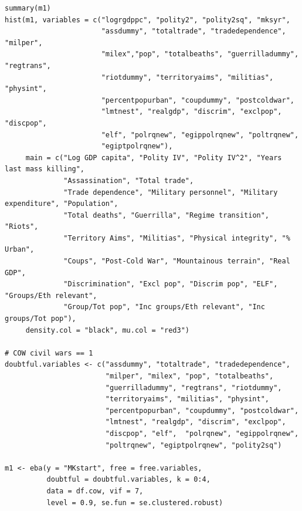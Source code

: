 \begin{verbatim}
summary(m1)
hist(m1, variables = c("logrgdppc", "polity2", "polity2sq", "mksyr",
                       "assdummy", "totaltrade", "tradedependence", "milper",
                       "milex","pop", "totalbeaths", "guerrilladummy", "regtrans",
                       "riotdummy", "territoryaims", "militias", "physint",
                       "percentpopurban", "coupdummy", "postcoldwar",
                       "lmtnest", "realgdp", "discrim", "exclpop", "discpop",
                       "elf", "polrqnew", "egippolrqnew", "poltrqnew",
                       "egiptpolrqnew"),
     main = c("Log GDP capita", "Polity IV", "Polity IV^2", "Years last mass killing",
              "Assassination", "Total trade", 
              "Trade dependence", "Military personnel", "Military expenditure", "Population", 
              "Total deaths", "Guerrilla", "Regime transition", "Riots",
              "Territory Aims", "Militias", "Physical integrity", "% Urban",
              "Coups", "Post-Cold War", "Mountainous terrain", "Real GDP",
              "Discrimination", "Excl pop", "Discrim pop", "ELF", "Groups/Eth relevant", 
              "Group/Tot pop", "Inc groups/Eth relevant", "Inc groups/Tot pop"),
     density.col = "black", mu.col = "red3")
     
# COW civil wars == 1
doubtful.variables <- c("assdummy", "totaltrade", "tradedependence",
                        "milper", "milex", "pop", "totalbeaths",
                        "guerrilladummy", "regtrans", "riotdummy",
                        "territoryaims", "militias", "physint",
                        "percentpopurban", "coupdummy", "postcoldwar",
                        "lmtnest", "realgdp", "discrim", "exclpop",
                        "discpop", "elf",  "polrqnew", "egippolrqnew",
                        "poltrqnew", "egiptpolrqnew", "polity2sq")

m1 <- eba(y = "MKstart", free = free.variables,
          doubtful = doubtful.variables, k = 0:4,
          data = df.cow, vif = 7,
          level = 0.9, se.fun = se.clustered.robust)
          

\end{verbatim}
